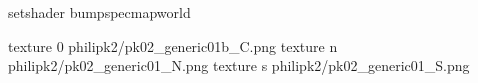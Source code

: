 setshader bumpspecmapworld

texture 0 philipk2/pk02_generic01b_C.png
texture n philipk2/pk02_generic01_N.png
texture s philipk2/pk02_generic01_S.png

